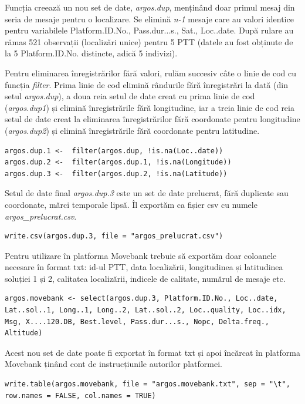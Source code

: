 \documentclass[11pt,onehalfspacing]{elife}
\begin{document}
Funcția creează un nou set de date, \textit{argos.dup}, menținând doar primul mesaj din seria de mesaje pentru o localizare. Se elimină \textit{n-1} mesaje care au valori identice pentru variabilele Platform.ID.No., Pass.dur...s., Sat., Loc..date. După rulare au rămas 521 observații (localizări unice) pentru 5 PTT (datele au fost obținute de la 5 Platform.ID.No. distincte, adică 5 indivizi).

Pentru eliminarea înregistrărilor fără valori, rulăm succesiv câte o linie de cod cu funcția \textit{filter}. Prima linie de cod elimină rândurile fără înregistrări la dată (din setul \textit{argos.dup}), a doua reia setul de date creat cu prima linie de cod (\textit{argos.dup1}) și elimină înregistrările fără longitudine, iar a treia linie de cod reia setul de date creat la eliminarea înregistrărilor fără coordonate pentru longitudine (\textit{argos.dup2}) și elimină înregistrările fără coordonate pentru latitudine.
\begin{lstlisting}
argos.dup.1 <-  filter(argos.dup, !is.na(Loc..date))
argos.dup.2 <-  filter(argos.dup.1, !is.na(Longitude))
argos.dup.3 <-  filter(argos.dup.2, !is.na(Latitude))
\end{lstlisting}

Setul de date final \textit{argos.dup.3} este un set de date prelucrat, fără duplicate sau coordonate, mărci temporale lipsă. Îl exportăm ca fișier csv cu numele \textit{argos\_prelucrat.csv}.
\begin{lstlisting}
write.csv(argos.dup.3, file = "argos_prelucrat.csv")
\end{lstlisting}

Pentru utilizare în platforma Movebank trebuie să exportăm doar coloanele necesare în format txt: id-ul PTT, data localizării, longitudinea și latitudinea soluției 1 și 2, calitatea localizării, indicele de calitate, numărul de mesaje etc.
\begin{lstlisting}
argos.movebank <- select(argos.dup.3, Platform.ID.No., Loc..date, Lat..sol..1, Long..1, Long..2, Lat..sol..2, Loc..quality, Loc..idx, Msg, X....120.DB, Best.level, Pass.dur...s., Nopc, Delta.freq., Altitude)
\end{lstlisting}

Acest nou set de date poate fi exportat în format txt și apoi încărcat în platforma Movebank ținând cont de instrucțiunile autorilor platformei. 
\begin{lstlisting}
write.table(argos.movebank, file = "argos.movebank.txt", sep = "\t", row.names = FALSE, col.names = TRUE)
\end{lstlisting}
\end{document}
